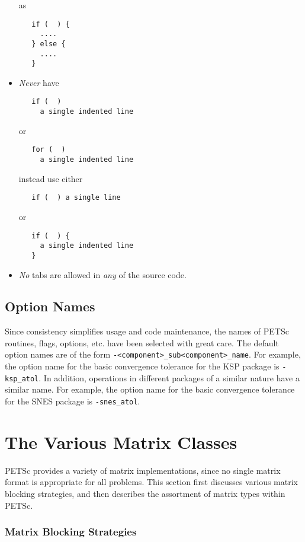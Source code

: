 \begin{itemize}
as
\begin{verbatim}
   if (  ) {
     ....
   } else {
     ....
   }
\end{verbatim}
\item {\em Never}  have 
\begin{verbatim}
   if (  ) 
     a single indented line
\end{verbatim}
or
\begin{verbatim}
   for (  )
     a single indented line
\end{verbatim}
instead use either 
\begin{verbatim}
   if (  ) a single line
\end{verbatim}
or 
\begin{verbatim}
   if (  ) {
     a single indented line
   }
\end{verbatim}
\item {\em No} tabs are allowed in {\em any} of the source code.
\end{itemize}

\section{Option Names}

Since consistency simplifies usage and code maintenance, the names of
PETSc routines, flags, options, etc. have been selected with great care.
The default option names are of the form {\tt -<component>\_sub<component>\_name}.  
For example, the option name for the basic convergence tolerance for 
the KSP package is {\tt -ksp\_atol}. In addition, operations in different 
packages of a similar nature have a similar name.  For example, the option
name for the basic convergence tolerance for the SNES package is 
{\tt -snes\_atol}.

\chapter{The Various Matrix Classes}
\label{sec:matclasses}

PETSc provides a variety of matrix implementations, since no single
matrix format is appropriate for all problems.  This section first
discusses various matrix blocking strategies, and then 
describes the assortment of matrix types within PETSc.

\subsection{Matrix Blocking Strategies}

